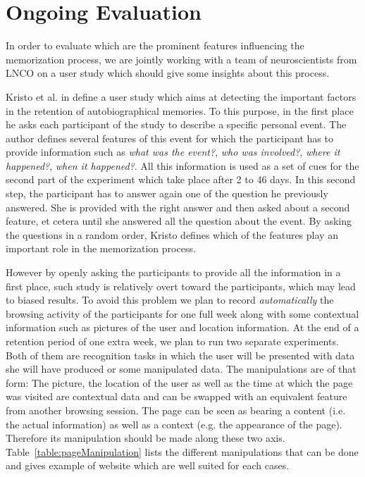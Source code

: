 \documentclass[10pt,a4paper]{article}
\begin{document}

\section{Ongoing Evaluation}
\label{sec:evaluation}

In order to evaluate which are the prominent features influencing the memorization process, we are jointly working with a team of neuroscientists from LNCO on a user study which should give some insights about this process.

Kristo et al. in \cite{kristo2009retention} define a user study which aims at detecting the important factors in the retention of autobiographical memories. To this purpose, in the first place he asks each participant of the study to describe a specific personal event. The author defines several features of this event for which the participant has to provide information such as \textit{what was the event?}, \textit{who was involved?}, \textit{where it happened?}, \textit{when it happened?}. All this information is used as a set of cues for the second part of the experiment which take place after 2 to 46 days. In this second step, the participant has to answer again one of the question he previously answered. She is provided with the right answer and then asked about a second feature, et cetera until she answered all the question about the event. By asking the questions in a random order, Kristo defines which of the features play an important role in the memorization process.

However by openly asking the participants to provide all the information in a first place, such study is relatively overt toward the participants, which may lead to biased results. To avoid this problem we plan to record \textit{automatically} the browsing activity of the participants for one full week along with some contextual information such as pictures of the user and location information. At the end of a retention period of one extra week, we plan to run two separate experiments. Both of them are recognition tasks in which the user will be presented with data she will have produced or some manipulated data. The manipulations are of that form: The picture, the location of the user as well as the time at which the page was visited are contextual data and can be swapped with an equivalent feature from another browsing session. The page can be seen as bearing a content (i.e. the actual information) as well as a context (e.g. the appearance of the page). Therefore its manipulation should be made along these two axis. Table~\ref{table:pageManipulation} lists the different manipulations that can be done and gives example of website which are well suited for each cases.
\end{document}
